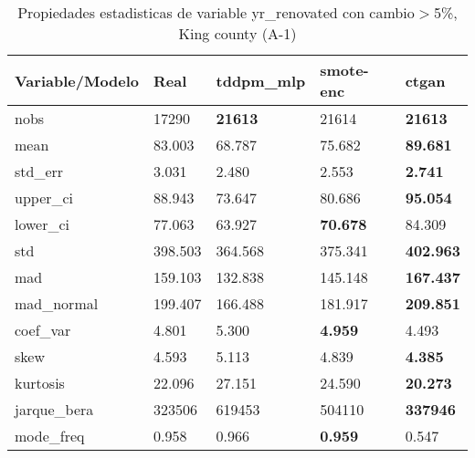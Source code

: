 \begin{table}[H]
\centering
\fontsize{8}{14}\selectfont
\caption{Propiedades estadisticas de variable yr\_renovated con cambio\ensuremath{>}5\%, King county (A-1)}
\label{table-stats-king county-a-1-yr_renovated-short}
\begin{tabular}{|l|m{10em}|m{10em}|m{10em}|m{10em}|}
\hline
 \rowcolor[gray]{0.8}
Variable/Modelo & Real & tddpm\_mlp & smote-enc & ctgan \\
\hline nobs & 17290 & \bfseries 21613 & \cellcolor[rgb]{0.9, 0.54, 0.52} 21614 & \bfseries 21613 \\
\hline mean & 83.003 & \cellcolor[rgb]{0.9, 0.54, 0.52} 68.787 & 75.682 & \bfseries 89.681 \\
\hline std\_err & 3.031 & \cellcolor[rgb]{0.9, 0.54, 0.52} 2.480 & 2.553 & \bfseries 2.741 \\
\hline upper\_ci & 88.943 & \cellcolor[rgb]{0.9, 0.54, 0.52} 73.647 & 80.686 & \bfseries 95.054 \\
\hline lower\_ci & 77.063 & \cellcolor[rgb]{0.9, 0.54, 0.52} 63.927 & \bfseries 70.678 & 84.309 \\
\hline std & 398.503 & \cellcolor[rgb]{0.9, 0.54, 0.52} 364.568 & 375.341 & \bfseries 402.963 \\
\hline mad & 159.103 & \cellcolor[rgb]{0.9, 0.54, 0.52} 132.838 & 145.148 & \bfseries 167.437 \\
\hline mad\_normal & 199.407 & \cellcolor[rgb]{0.9, 0.54, 0.52} 166.488 & 181.917 & \bfseries 209.851 \\
\hline coef\_var & 4.801 & \cellcolor[rgb]{0.9, 0.54, 0.52} 5.300 & \bfseries 4.959 & 4.493 \\
\hline skew & 4.593 & \cellcolor[rgb]{0.9, 0.54, 0.52} 5.113 & 4.839 & \bfseries 4.385 \\
\hline kurtosis & 22.096 & \cellcolor[rgb]{0.9, 0.54, 0.52} 27.151 & 24.590 & \bfseries 20.273 \\
\hline jarque\_bera & 323506 & \cellcolor[rgb]{0.9, 0.54, 0.52} 619453 & 504110 & \bfseries 337946 \\
\hline mode\_freq & 0.958 & 0.966 & \bfseries 0.959 & \cellcolor[rgb]{0.9, 0.54, 0.52} 0.547 \\
\hline
\end{tabular}
\end{table}
